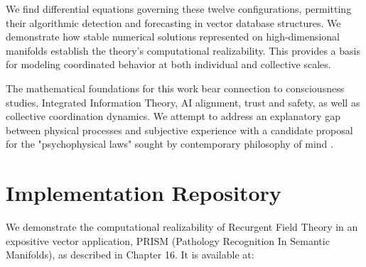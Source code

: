 \documentclass[11pt, a4paper]{report}
\begin{document}
\vspace{1em}

We find differential equations governing these twelve configurations, permitting their algorithmic detection and forecasting in vector database structures. We demonstrate how stable numerical solutions represented on high-dimensional manifolds establish the theory's computational realizability. This provides a basis for modeling coordinated behavior at both individual and collective scales.

\vspace{1em}

The mathematical foundations for this work bear connection to consciousness studies, Integrated Information Theory, AI alignment, trust and safety, as well as collective coordination dynamics. We attempt to address an explanatory gap between physical processes and subjective experience with a candidate proposal for the "psychophysical laws" sought by contemporary philosophy of mind \autocite{Chalmers1996}.

\tableofcontents


















\appendix
\chapter{Implementation Repository}
\label{appendix:implementation}

We demonstrate the computational realizability of Recurgent Field Theory in an expositive vector application, PRISM (Pathology Recognition In Semantic Manifolds), as described in Chapter 16. It is available at:
\end{document}
